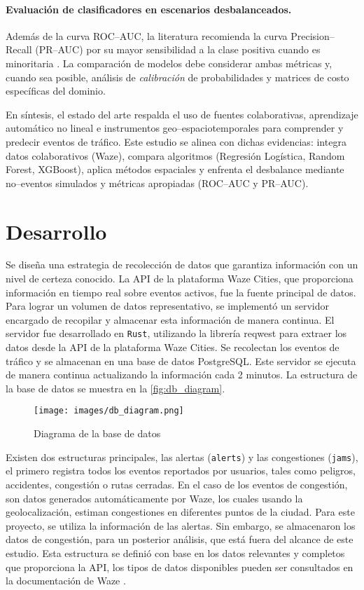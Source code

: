 \documentclass[12pt]{article}
\begin{document}
\paragraph{Evaluación de clasificadores en escenarios desbalanceados.}
Además de la curva ROC–AUC, la literatura recomienda la curva Precision–Recall (PR–AUC) por su mayor sensibilidad a la clase positiva cuando es minoritaria \parencite{saito2015}. La comparación de modelos debe considerar ambas métricas y, cuando sea posible, análisis de \textit{calibración} de probabilidades y matrices de costo específicas del dominio.

En síntesis, el estado del arte respalda el uso de fuentes colaborativas, aprendizaje automático no lineal e instrumentos geo–espaciotemporales para comprender y predecir eventos de tráfico. Este estudio se alinea con dichas evidencias: integra datos colaborativos (Waze), compara algoritmos (Regresión Logística, Random Forest, XGBoost), aplica métodos espaciales y enfrenta el desbalance mediante no–eventos simulados y métricas apropiadas (ROC–AUC y PR–AUC).

\section{Desarrollo}

Se diseña una estrategia de recolección de datos que garantiza información con un nivel de certeza conocido. La API de la plataforma Waze Cities, que proporciona información en tiempo real sobre eventos activos, fue la fuente principal de datos. Para lograr un volumen de datos representativo, se implementó un servidor encargado de recopilar y almacenar esta información de manera continua. El servidor fue desarrollado en \texttt{Rust}, utilizando la librería reqwest \parencite{reqwest2025} para extraer los datos desde la API de la plataforma Waze Cities. Se recolectan los eventos de tráfico y se almacenan en una base de datos PostgreSQL. Este servidor se ejecuta de manera continua actualizando la información cada 2 minutos. La estructura de la base de datos se muestra en la \autoref{fig:db_diagram}.

\begin{figure}[H]
    \centering
    \texttt{[image: images/db\_diagram.png]}
    \caption{Diagrama de la base de datos}
    \label{fig:db_diagram}
\end{figure}

Existen dos estructuras principales, las alertas (\texttt{alerts}) y las congestiones (\texttt{jams}), el primero registra todos los eventos reportados por usuarios, tales como peligros, accidentes, congestión o rutas cerradas. En el caso de los eventos de congestión, son datos generados automáticamente por Waze, los cuales usando la geolocalización, estiman congestiones en diferentes puntos de la ciudad. Para este proyecto, se utiliza la información de las alertas. Sin embargo, se almacenaron los datos de congestión, para un posterior análisis, que está fuera del alcance de este estudio. Esta estructura se definió con base en los datos relevantes y completos que proporciona la API, los tipos de datos disponibles pueden ser consultados en la documentación de Waze \parencite{waze2024}.
\end{document}
